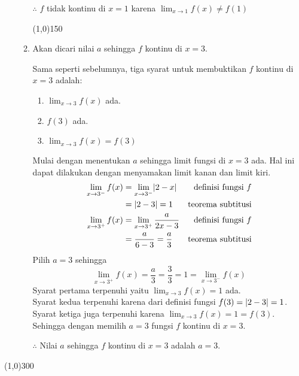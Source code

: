 \begin{enumerate}[leftmargin=*, label={\arabic*}.]
\begin{enumerate}[label={\alph*}.]
    $\therefore$ $f$ tidak kontinu di $x=1$ karena $\lim_{x\to 1} f(x) \neq f(1)$
    

\begin{center}\line(1,0){150}\end{center}


    \item Akan dicari nilai $a$ sehingga $f$ kontinu di $x=3$.
    
    Sama seperti sebelumnya, tiga syarat untuk membuktikan $f$ kontinu di
    $x=3$ adalah:
        \begin{enumerate}[label={\arabic*}.]
        \item $\lim_{x\to 3} f(x)$ ada.
        \item $f(3)$ ada.
        \item $\lim_{x\to 3} f(x) = f(3)$
        \end{enumerate}
    Mulai dengan menentukan $a$ sehingga limit fungsi di $x=3$ ada. Hal ini 
    dapat dilakukan dengan menyamakan limit kanan dan limit kiri.
    \begin{align*}
        \lim_{x\to 3^{-}} f(x) 
        &= \lim_{x\to 3^{-}} \lvert2-x\rvert
        &\text{definisi fungsi $f$}\\
        &= \lvert2-3\rvert = 1
        &\text{teorema subtitusi}\\
        \lim_{x\to 3^{+}} f(x) 
        &= \lim_{x\to 3^{+}} \frac{a}{2x-3}
        &\text{definisi fungsi $f$}\\
        &= \frac{a}{6-3} = \frac{a}{3}
        &\text{teorema subtitusi}
    \end{align*}
    Pilih $a = 3$ sehingga
    \[
        \lim_{x\to 3^{+}} f(x) = \frac{a}{3} = \frac{3}{3} = 1 = \lim_{x\to 3^{-}} f(x) 
    \]
    Syarat pertama terpenuhi yaitu $\lim_{x\to 3} f(x) = 1$ ada.\\
    Syarat kedua terpenuhi karena dari definisi fungsi $f(3) = \lvert2-3\rvert = 1$.\\
    Syarat ketiga juga terpenuhi karena $\lim_{x\to 3} f(x) = 1 = f(3)$.
    Sehingga dengan memilih $a=3$ fungsi $f$ kontinu di $x=3$.

    $\therefore$ Nilai $a$ sehingga $f$ kontinu di $x=3$ adalah $a=3$.

    \end{enumerate}
\end{enumerate}

\begin{center}\line(1,0){300}\end{center}
